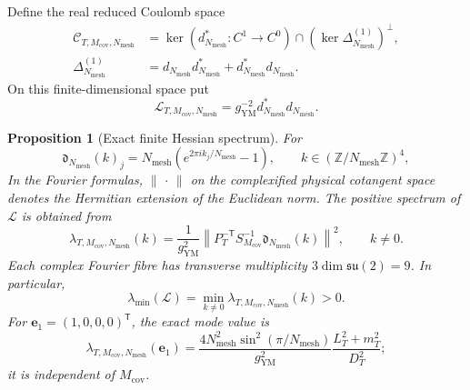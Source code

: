 \documentclass[11pt]{article}
\newtheorem{proposition}[theorem]{Proposition}
\theoremstyle{definition}
\numberwithin{equation}{section}
\begin{document}
Define the real reduced Coulomb space
\begin{align}
 \mathscr C_{T,M_{\mathrm{cov}},N_{\mathrm{mesh}}}
 &=
 \ker(d_{N_{\mathrm{mesh}}}^*:C^1\to C^0)
 \cap
 \left(\ker\Delta^{(1)}_{N_{\mathrm{mesh}}}\right)^\perp,
 \label{cusp-link-reduced-coulomb-space}\\
 \Delta^{(1)}_{N_{\mathrm{mesh}}}
 &=d_{N_{\mathrm{mesh}}}d_{N_{\mathrm{mesh}}}^*
 +d_{N_{\mathrm{mesh}}}^*d_{N_{\mathrm{mesh}}}.
 \label{cusp-link-finite-hodge-laplacian}
\end{align}
On this finite-dimensional space put
\begin{equation}
 \mathcal L_{T,M_{\mathrm{cov}},N_{\mathrm{mesh}}}
 =g_{\mathrm{YM}}^{-2}d_{N_{\mathrm{mesh}}}^*
                         d_{N_{\mathrm{mesh}}}.
 \label{cusp-link-finite-hessian}
\end{equation}

\begin{proposition}[Exact finite Hessian spectrum]
\label{cusp-link-finite-spectrum}
For
\begin{equation}
 \mathfrak d_{N_{\mathrm{mesh}}}(k)_j
 =N_{\mathrm{mesh}}
  \left(e^{2\pi i k_j/N_{\mathrm{mesh}}}-1\right),
 \qquad
 k\in(\mathbb Z/N_{\mathrm{mesh}}\mathbb Z)^4,
 \label{cusp-link-fourier-symbol}
\end{equation}
In the Fourier formulas, \(\lVert\,\cdot\,\rVert\) on the complexified physical
cotangent space denotes the Hermitian extension of the Euclidean norm.  The
positive spectrum of \(\mathcal L\) is obtained from
\begin{equation}
 \lambda_{T,M_{\mathrm{cov}},N_{\mathrm{mesh}}}(k)
 =\frac1{g_{\mathrm{YM}}^2}
  \left\lVert
   P_T^{-\mathsf T}S_{M_{\mathrm{cov}}}^{-1}
   \mathfrak d_{N_{\mathrm{mesh}}}(k)
  \right\rVert^2,
 \qquad k\neq0.
 \label{cusp-link-finite-mode-eigenvalue}
\end{equation}
Each complex Fourier fibre has transverse multiplicity
\(3\dim\mathfrak{su}(2)=9\).  In particular,
\begin{equation}
 \lambda_{\min}(\mathcal L)
 =\min_{k\neq0}\lambda_{T,M_{\mathrm{cov}},N_{\mathrm{mesh}}}(k)>0.
 \label{cusp-link-finite-minimum}
\end{equation}
For \(\mathbf e_1=(1,0,0,0)^{\mathsf T}\), the exact mode value is
\begin{equation}
 \lambda_{T,M_{\mathrm{cov}},N_{\mathrm{mesh}}}(\mathbf e_1)
 =\frac{4N_{\mathrm{mesh}}^2
              \sin^2(\pi/N_{\mathrm{mesh}})}{g_{\mathrm{YM}}^2}
  \frac{L_T^2+m_T^2}{D_T^2};
 \label{cusp-link-cover-soft-mode}
\end{equation}
it is independent of \(M_{\mathrm{cov}}\).
\end{proposition}
\end{document}
